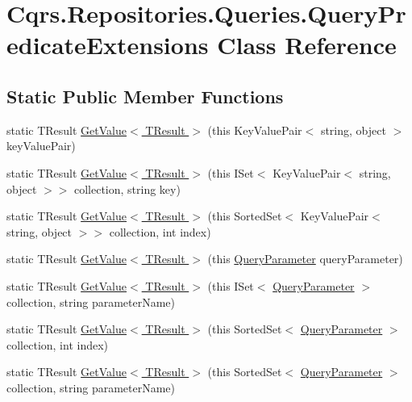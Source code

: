 \hypertarget{classCqrs_1_1Repositories_1_1Queries_1_1QueryPredicateExtensions}{}\section{Cqrs.\+Repositories.\+Queries.\+Query\+Predicate\+Extensions Class Reference}
\label{classCqrs_1_1Repositories_1_1Queries_1_1QueryPredicateExtensions}
\subsection*{Static Public Member Functions}
\begin{DoxyCompactItemize}
\item 
static T\+Result \hyperlink{classCqrs_1_1Repositories_1_1Queries_1_1QueryPredicateExtensions_aa76dc536f915299de4743ac9b801433d}{Get\+Value$<$ T\+Result $>$} (this Key\+Value\+Pair$<$ string, object $>$ key\+Value\+Pair)
\item 
static T\+Result \hyperlink{classCqrs_1_1Repositories_1_1Queries_1_1QueryPredicateExtensions_ae7ce4440706b552213ec680ac3391b7a}{Get\+Value$<$ T\+Result $>$} (this I\+Set$<$ Key\+Value\+Pair$<$ string, object $>$$>$ collection, string key)
\item 
static T\+Result \hyperlink{classCqrs_1_1Repositories_1_1Queries_1_1QueryPredicateExtensions_a54d17009ea7aa13b5ca6b4f653d06d82}{Get\+Value$<$ T\+Result $>$} (this Sorted\+Set$<$ Key\+Value\+Pair$<$ string, object $>$$>$ collection, int index)
\item 
static T\+Result \hyperlink{classCqrs_1_1Repositories_1_1Queries_1_1QueryPredicateExtensions_a185f34dfbcf58429fc407b594c55f511}{Get\+Value$<$ T\+Result $>$} (this \hyperlink{classCqrs_1_1Repositories_1_1Queries_1_1QueryParameter}{Query\+Parameter} query\+Parameter)
\item 
static T\+Result \hyperlink{classCqrs_1_1Repositories_1_1Queries_1_1QueryPredicateExtensions_a64fd0cc36edc56c037cd876034d92ebc}{Get\+Value$<$ T\+Result $>$} (this I\+Set$<$ \hyperlink{classCqrs_1_1Repositories_1_1Queries_1_1QueryParameter}{Query\+Parameter} $>$ collection, string parameter\+Name)
\item 
static T\+Result \hyperlink{classCqrs_1_1Repositories_1_1Queries_1_1QueryPredicateExtensions_a8544c5998b585aac97320e4205093ba3}{Get\+Value$<$ T\+Result $>$} (this Sorted\+Set$<$ \hyperlink{classCqrs_1_1Repositories_1_1Queries_1_1QueryParameter}{Query\+Parameter} $>$ collection, int index)
\item 
static T\+Result \hyperlink{classCqrs_1_1Repositories_1_1Queries_1_1QueryPredicateExtensions_a8ede744015309723a289ace4795ba14a}{Get\+Value$<$ T\+Result $>$} (this Sorted\+Set$<$ \hyperlink{classCqrs_1_1Repositories_1_1Queries_1_1QueryParameter}{Query\+Parameter} $>$ collection, string parameter\+Name)
\end{DoxyCompactItemize}


